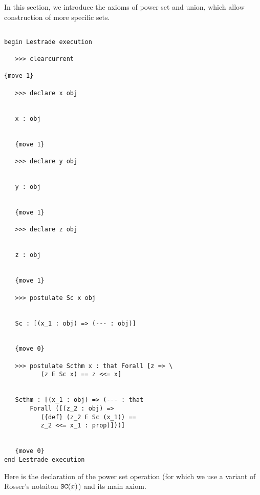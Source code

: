 \documentclass[12pt]{article}
\begin{document}
In this section, we introduce the axioms of power set and union, which allow construction of more specific sets.

\begin{verbatim}

begin Lestrade execution

   >>> clearcurrent

{move 1}

   >>> declare x obj


   x : obj


   {move 1}

   >>> declare y obj


   y : obj


   {move 1}

   >>> declare z obj


   z : obj


   {move 1}

   >>> postulate Sc x obj


   Sc : [(x_1 : obj) => (--- : obj)]


   {move 0}

   >>> postulate Scthm x : that Forall [z => \
          (z E Sc x) == z <<= x]


   Scthm : [(x_1 : obj) => (--- : that 
       Forall ([(z_2 : obj) => 
          ({def} (z_2 E Sc (x_1)) == 
          z_2 <<= x_1 : prop)]))]


   {move 0}
end Lestrade execution
\end{verbatim}

Here is the declaration of the power set operation (for which we use a variant of Rosser's notaiton ${\tt SC}(x)$) and its main axiom.
\end{document}

